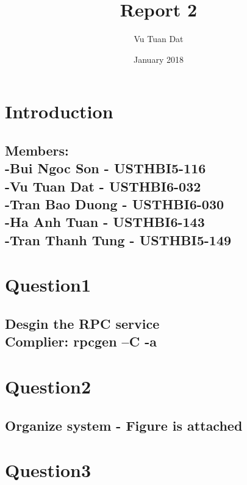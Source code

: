 \documentclass{article}
\title{Report 2}
\author{Vu Tuan Dat }
\date{January 2018}
\begin{document}
\maketitle

\section{Introduction}

\subsection{Members:\\-Bui Ngoc Son - USTHBI5-116\\-Vu Tuan Dat - USTHBI6-032\\-Tran Bao Duong - USTHBI6-030\\-Ha Anh Tuan - USTHBI6-143\\-Tran Thanh Tung - USTHBI5-149}
\section{Question1}
\subsection{ Desgin the RPC service\\

Complier: rpcgen –C -a  }
\section{Question2}
\subsection{
Organize system
 - Figure is attached}
 
 
 \section{Question3}
\end{document}
